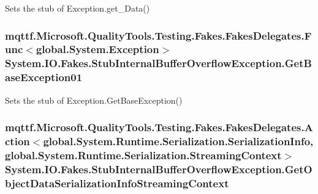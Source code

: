 Sets the stub of Exception.\-get\-\_\-\-Data()

\hypertarget{class_system_1_1_i_o_1_1_fakes_1_1_stub_internal_buffer_overflow_exception_a5bb362c18a9aeb1a988f600356f07dfd}{
\subsubsection[{Get\-Base\-Exception01}]{\setlength{\rightskip}{0pt plus 5cm}mqttf.\-Microsoft.\-Quality\-Tools.\-Testing.\-Fakes.\-Fakes\-Delegates.\-Func$<$global.\-System.\-Exception$>$ System.\-I\-O.\-Fakes.\-Stub\-Internal\-Buffer\-Overflow\-Exception.\-Get\-Base\-Exception01}}\label{class_system_1_1_i_o_1_1_fakes_1_1_stub_internal_buffer_overflow_exception_a5bb362c18a9aeb1a988f600356f07dfd}


Sets the stub of Exception.\-Get\-Base\-Exception()

\hypertarget{class_system_1_1_i_o_1_1_fakes_1_1_stub_internal_buffer_overflow_exception_a7b04f456c87446a22dbd3bf9691a8a26}{
\subsubsection[{Get\-Object\-Data\-Serialization\-Info\-Streaming\-Context}]{\setlength{\rightskip}{0pt plus 5cm}mqttf.\-Microsoft.\-Quality\-Tools.\-Testing.\-Fakes.\-Fakes\-Delegates.\-Action$<$global.\-System.\-Runtime.\-Serialization.\-Serialization\-Info, global.\-System.\-Runtime.\-Serialization.\-Streaming\-Context$>$ System.\-I\-O.\-Fakes.\-Stub\-Internal\-Buffer\-Overflow\-Exception.\-Get\-Object\-Data\-Serialization\-Info\-Streaming\-Context}}\label{class_system_1_1_i_o_1_1_fakes_1_1_stub_internal_buffer_overflow_exception_a7b04f456c87446a22dbd3bf9691a8a26}


